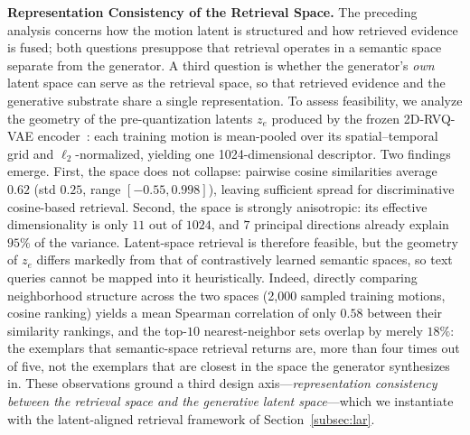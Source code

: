 \documentclass[10pt,journal,compsoc]{IEEEtran}
\newcommand{\myparagraph}[1]{\textbf{#1}\hspace{1.8ex}}
\begin{document}
\noindent \myparagraph{Representation Consistency of the Retrieval Space.}
The preceding analysis concerns how the motion latent is structured and how retrieved evidence is fused; both questions presuppose that retrieval operates in a semantic space separate from the generator. A third question is whether the generator's \emph{own} latent space can serve as the retrieval space, so that retrieved evidence and the generative substrate share a single representation. To assess feasibility, we analyze the geometry of the pre-quantization latents $z_e$ produced by the frozen 2D-RVQ-VAE encoder~\cite{mogents}: each training motion is mean-pooled over its spatial--temporal grid and $\ell_2$-normalized, yielding one 1024-dimensional descriptor. Two findings emerge. First, the space does not collapse: pairwise cosine similarities average $0.62$ (std $0.25$, range $[-0.55, 0.998]$), leaving sufficient spread for discriminative cosine-based retrieval. Second, the space is strongly anisotropic: its effective dimensionality is only $11$ out of $1024$, and $7$ principal directions already explain $95\%$ of the variance. Latent-space retrieval is therefore feasible, but the geometry of $z_e$ differs markedly from that of contrastively learned semantic spaces, so text queries cannot be mapped into it heuristically. Indeed, directly comparing neighborhood structure across the two spaces (2,000 sampled training motions, cosine ranking) yields a mean Spearman correlation of only $0.58$ between their similarity rankings, and the top-$10$ nearest-neighbor sets overlap by merely $18\%$: the exemplars that semantic-space retrieval returns are, more than four times out of five, not the exemplars that are closest in the space the generator synthesizes in. These observations ground a third design axis---\emph{representation consistency between the retrieval space and the generative latent space}---which we instantiate with the latent-aligned retrieval framework of Section~\ref{subsec:lar}.

\end{document}
